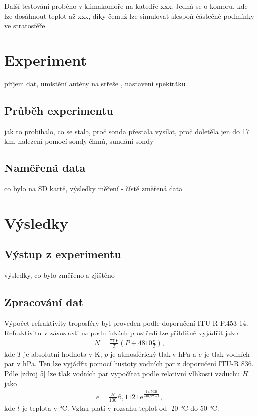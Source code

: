\documentclass[twoside]{ctuthesis}
\theoremstyle{plain}
\theoremstyle{definition}
\theoremstyle{note}
\begin{document}
	Další testování proběho v klimakomoře na katedře xxx. Jedná se o komoru, kde lze dosáhnout teplot až xxx, díky čemuž lze simulovat alespoň částečně podmínky ve stratosféře.


	

	
















	

\chapter{Experiment}
	příjem dat, umístění antény na střeše , nastavení spektráku
	\section{Průběh experimentu}
	jak to probíhalo, co se stalo, proč sonda přestala vysílat, proč doletěla jen do 17 km, nalezení pomocí sondy čhmú, sundání sondy

	\section{Naměřená data}
	co bylo na SD kartě, výsledky měření - čístě změřená data



\chapter{Výsledky}
	\section{Výstup z experimentu}
	výsledky, co bylo změřeno a zjištěno
\newpage
	\section{Zpracování dat}


	Výpočet refraktivity troposféry byl proveden podle doporučení ITU-R P.453-14. Refraktivitu v závoslosti na podmínkách prostředí lze přibližně vyjádřit jako
	\begin{align}
		N = \frac{77.6}{T} \left(P + 4810\frac{e}{T}\right),
	\end{align}
	kde $T$ je absolutní hodnota v K, $p$ je atmosférický tlak v hPa a $e$ je tlak vodních par v hPa. Ten lze vyjádřit pomocí hustoty vodních par z doporučení ITU-R 836. Pdle [zdroj 5] lze tlak vodních par vypočítat podle relativní vlhkosti vzduchu $H$ jako
	\begin{align}
		e = \frac{H}{100}\,6{,}1121\,\text{e}^{\frac{17{,}502t}{240{,}97 + t}},
	\end{align}
	kde $t$ je teplota v °C. Vztah platí v rozsahu teplot od -20 °C do 50 °C.
\end{document}
